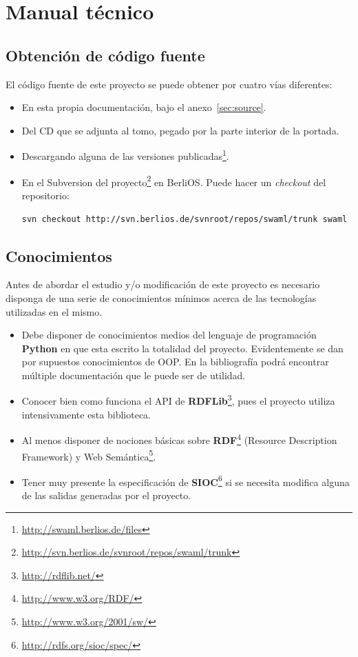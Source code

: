 
\section{Manual técnico}

\subsection*{Obtención de código fuente}

El código fuente de este proyecto se puede obtener por cuatro vías diferentes:

\begin{itemize}
  \item En esta propia documentación, bajo el anexo~\ref{sec:source}.
  \item Del CD que se adjunta al tomo, pegado por la parte interior
	de la portada.
  \item Descargando alguna de las versiones
	publicadas\footnote{\url{http://swaml.berlios.de/files}}.
  \item En el Subversion del proyecto\footnote{\url{http://svn.berlios.de/svnroot/repos/swaml/trunk}} 
	en BerliOS. Puede hacer un \emph{checkout} del repositorio:
	\begin{center}
	 \texttt{svn checkout http://svn.berlios.de/svnroot/repos/swaml/trunk swaml}
	\end{center}
\end{itemize}

\subsection*{Conocimientos}

Antes de abordar el estudio y/o modificación de este proyecto es necesario 
disponga de una serie de conocimientos mínimos acerca de las tecnologías
utilizadas en el mismo.

\begin{itemize}
  \item Debe disponer de conocimientos medios del lenguaje de programación 
	\textbf{Python} en que esta escrito la totalidad del proyecto. 
	Evidentemente se dan por supuestos conocimientos de OOP. En la
	bibliografía podrá encontrar múltiple documentación que le puede ser
	de utilidad.
  \item Conocer bien como funciona el API de 
	\textbf{RDFLib}\footnote{\url{http://rdflib.net/}}, pues el proyecto
	utiliza intensivamente esta biblioteca.
  \item Al menos disponer de nociones básicas sobre 
	\textbf{RDF}\footnote{\url{http://www.w3.org/RDF/}} (Resource Description 
	Framework) y Web Semántica\footnote{\url{http://www.w3.org/2001/sw/}}.
  \item Tener muy presente la especificación de 
	\textbf{SIOC}\footnote{\url{http://rdfs.org/sioc/spec/}} si se necesita
	modifica alguna de las salidas generadas por el proyecto.
\end{itemize}

